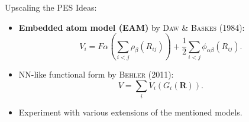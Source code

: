 \documentclass{beamer}
\begin{document}
\begin{frame}{Upscaling the PES}
    Ideas:
    \begin{itemize}
        \item \textbf{Embedded atom model (EAM)} by \textsc{Daw \& Baskes} (1984):
        \begin{equation}
            V_i = F\alpha\left(\sum_{i<j}\rho_\beta(R_{ij})\right)+\frac{1}{2}\sum_{i<j}\phi_{\alpha\beta}(R_{ij}).
        \end{equation}
        \item NN-like functional form by \textsc{Behler} (2011):
        \begin{equation}
            V = \sum_i V_i(G_i(\mathbf{R})).
        \end{equation}
        \item Experiment with various extensions of the mentioned models.
    \end{itemize}
\end{frame}

%
\end{document}
